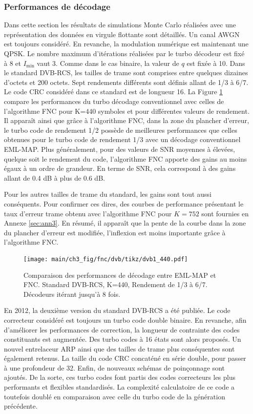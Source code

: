 \subsubsection{Performances de décodage}
Dans cette section les résultats de simulations Monte Carlo réalisées avec une représentation des données en virgule
flottante sont détaillés. Un canal AWGN est toujours considéré. En revanche, la modulation numérique est maintenant une QPSK. Le 
nombre maximum d'itérations réalisées par le turbo décodeur est fixé à 8 et $I_{\text{min}}$ vaut 3.
Comme dans le cas binaire, la valeur de $q$ est fixée à 10. Dans le standard DVB-RCS, les tailles de trame sont comprises
entre quelques dizaines d'octets et 200 octets. Sept rendements différents sont définis allant de 1/3 à 6/7. Le code CRC 
considéré dans ce standard est de longueur 16. La Figure \ref{fig:fnc_dvb1_440} compare les performances du turbo décodage
conventionnel avec celles de l'algorithme FNC pour K=440 symboles et pour différentes valeurs de rendement. Il apparaît 
ainsi que grâce à l'algorithme FNC, dans la zone du plancher d'erreur, le turbo code de rendement 1/2 possède de 
meilleures performances que celles obtenues pour le turbo code de rendement 1/3 avec un décodage conventionnel EML-MAP. 
Plus généralement, pour des valeurs de SNR moyennes à élevées, quelque soit le rendement du code, l'algorithme FNC apporte 
des gains au moins égaux à un ordre de grandeur. En terme de SNR, cela correspond à des gains allant de 0.4 dB à plus de 
0.6 dB.

Pour les autres tailles de trame du standard, les gains sont tout aussi conséquents. Pour confirmer ces
dires, des courbes de performance présentant le taux d'erreur trame obtenu avec l'algorithme FNC pour $K=752$ sont fournies en 
Annexe \ref{sec:ann3}. En résumé, il apparaît que la pente de la courbe dans la zone du plancher d'erreur est modifiée, l'inflexion
est moins importante grâce à l'algorithme FNC.

\begin{figure}[!htb]
	\centering
	\texttt{[image: main/ch3\_fig/fnc/dvb/tikz/dvb1\_440.pdf]}
	\caption{Comparaison des performances de décodage entre EML-MAP et FNC. Standard DVB-RCS, K=440, Rendement de 1/3 à 
	6/7. Décodeurs itérant jusqu'à 8 fois. \label{fig:fnc_dvb1_440}}
\end{figure}
En 2012, la deuxième version du standard DVB-RCS a été publiée. Le code correcteur considéré est toujours un turbo code double
binaire. En revanche, afin d'améliorer les performances de correction, la longueur de contrainte des codes constituants
est augmentée. Des turbo codes à 16 états sont alors proposés. Un nouvel entrelaceur ARP ainsi que des tailles de trame
plus conséquentes sont également retenus. La taille du code CRC concaténé en série double, pour passer à une profondeur de 32. 
Enfin, de nouveaux schémas de poinçonnage sont ajoutés. De la sorte, ces turbo codes font 
partis des codes correcteurs les plus performants et flexibles standardisés. La complexité calculatoire de ce code a
toutefois doublé en comparaison avec celle du turbo code de la génération précédente. 


